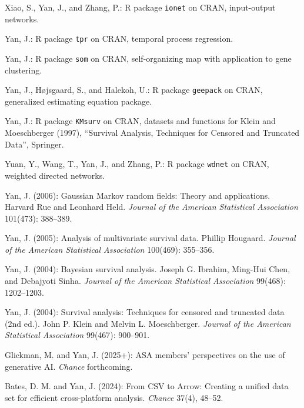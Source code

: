 \documentclass[Statistics]{vita}
\begin{document}
\begin{vita}
\begin{Publications}
\begin{Software}
  \item *Xiao, S., Yan, J., and Zhang, P.: R package \texttt{ionet} on CRAN, input-output networks.
  \item Yan, J.: R package \texttt{tpr} on CRAN, temporal process regression.
  \item Yan, J.: R package \texttt{som} on CRAN, self-organizing map with application to gene clustering.
  \item Yan, J., H\o{}jsgaard, S., and Halekoh, U.: R package \texttt{geepack} on CRAN, generalized estimating equation package.
  \item Yan, J.: R package \texttt{KMsurv} on CRAN,  datasets and functions for Klein and Moeschberger (1997), ``Survival Analysis, Techniques for Censored and Truncated Data'', Springer.
  \item *Yuan, Y., Wang, T., Yan, J., and Zhang, P.: R package \texttt{wdnet} on CRAN, weighted directed networks.
  \end{Software}
  \begin{BookReviews}
  \item Yan, J. (2006): Gaussian Markov random fields: Theory and applications. {H}arvard {R}ue and {L}eonhard {H}eld. {\em Journal of the American Statistical Association\/} 101(473): 388--389.
  \item Yan, J. (2005): Analysis of multivariate survival data. {P}hillip {H}ougaard. {\em Journal of the American Statistical Association\/} 100(469): 355--356.
  \item Yan, J. (2004): Bayesian survival analysis. {J}oseph {G}. {I}brahim, {M}ing-{H}ui {C}hen, and {D}ebajyoti {S}inha. {\em Journal of the American Statistical Association\/} 99(468): 1202--1203.
  \item Yan, J. (2004): Survival analysis: Techniques for censored and truncated data (2nd ed.). {J}ohn {P}. {K}lein and {M}elvin {L}. {M}oeschberger. {\em Journal of the American Statistical Association\/} 99(467): 900--901.
  \end{BookReviews}
  \begin{OtherPublications}
  \item Glickman, M. and Yan, J. (2025+): ASA members’ perspectives on the use of generative AI. {\em Chance\/} forthcoming.
  \item Bates, D. M. and Yan, J. (2024): From CSV to Arrow: Creating a unified data set for efficient cross-platform analysis. {\em Chance\/} 37(4), 48--52.

\end{OtherPublications}
\end{Publications}
\end{vita}
\end{document}
